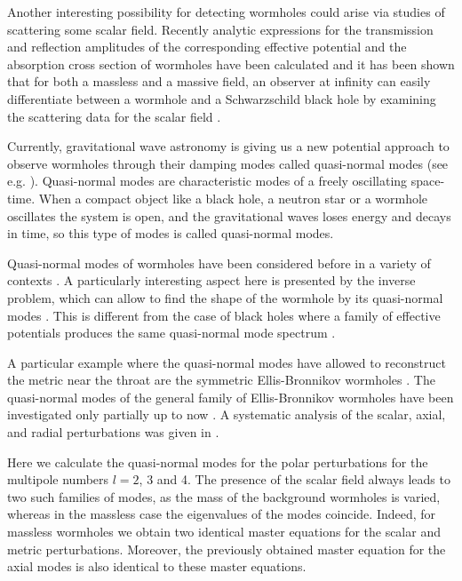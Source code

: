 \documentclass[a4paper,12pt]{article}
\begin{document}
 
Another interesting possibility for detecting wormholes could arise via studies of scattering some scalar field.
Recently analytic expressions for the transmission and reflection amplitudes of the corresponding effective potential and the absorption cross section of wormholes have been calculated and it has been shown that for both a massless and a massive field, an observer at infinity can easily differentiate between a wormhole and a Schwarzschild black hole by examining the scattering data for the scalar field \cite{Azad:2020ajs}. 

Currently, gravitational wave astronomy \cite{LIGOScientific:2016aoc,LIGOScientific:2017vwq,LIGOScientific:2017ync} is giving us a new potential approach to observe wormholes through their damping modes called quasi-normal modes (see e.g. \cite{Kokkotas:1999bd,Berti:2009kk,Konoplya:2011qq}). 
Quasi-normal modes are characteristic modes of a freely oscillating space-time. 
When a compact object like a black hole, a neutron star or a wormhole oscillates the system is open, and the gravitational waves loses energy and decays in time, so this type of modes is called quasi-normal modes.  


Quasi-normal modes of wormholes have been considered before in a variety of contexts \cite{Konoplya:2005et,Kim:2008zzj,Konoplya:2010kv,Konoplya:2016hmd,Volkel:2018hwb,Aneesh:2018hlp,Konoplya:2018ala,Blazquez-Salcedo:2018ipc,Konoplya:2019hml,Churilova:2019qph,Jusufi:2020mmy,Gonzalez:2022ote}.
A particularly interesting aspect here is presented by
the inverse problem, which can allow to find the shape of the wormhole by its quasi-normal modes \cite{Konoplya:2018ala,Volkel:2018hwb}. 
This is different from the case of black holes where a family of effective potentials produces the same quasi-normal mode spectrum \cite{Chandrasekhar:1985kt}.  

A particular example where the quasi-normal modes have allowed to reconstruct the metric near the throat are the symmetric Ellis-Bronnikov wormholes \cite{Konoplya:2018ala}. 
The quasi-normal modes of the general family of Ellis-Bronnikov wormholes have been investigated only partially up to now \cite{Konoplya:2005et,Kim:2008zzj,Blazquez-Salcedo:2018ipc}.
A systematic analysis of the scalar, axial, and radial perturbations was given in \cite{Blazquez-Salcedo:2018ipc}.

Here we calculate the quasi-normal modes for the polar perturbations for the multipole numbers $l=2$, 3 and 4. 
The presence of the scalar field always leads to two such families of modes, as the {mass} %
of the background wormholes is varied, whereas in the %
{massless} case the eigenvalues of the modes coincide.
Indeed, for massless wormholes we obtain two identical master equations for the scalar and metric perturbations.
Moreover, the previously obtained master equation for the axial modes \cite{Blazquez-Salcedo:2018ipc} is also identical to these master equations.
  
\end{document}
